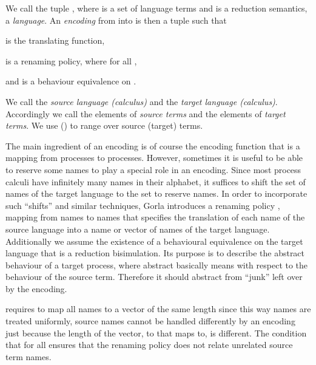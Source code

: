 \documentclass[final,copyright,creativecommons]{eptcs}
\begin{document}
We call the tuple , where  is a set of language terms and  is a reduction semantics, a \emph{language}.
An \emph{encoding} from  into  is then a tuple  such that
\begin{compactitem}
	\item  is the translating function,
	\item  is a renaming policy, where  for all ,
	\item and  is a behaviour equivalence on .
\end{compactitem}
We call  the \emph{source language (calculus)} and  the \emph{target language (calculus)}. Accordingly we call the elements of  \emph{source terms} and the elements of  \emph{target terms}.
We use  () to range over source (target) terms.

The main ingredient of an encoding is of course the encoding function  that is a mapping from processes to processes.
However, sometimes it is useful to be able to reserve some names to play a special role in an encoding.
Since most process calculi have infinitely many names in their alphabet, it suffices to shift the set of names  of the target language to the set  to reserve  names. In order to incorporate such ``shifts'' and similar techniques, Gorla introduces a renaming policy , \ie mapping from names to names that specifies the translation of each name of the source language into a name or vector of names of the target language.
Additionally we assume the existence of a behavioural equivalence  on the target language that is a reduction bisimulation. Its purpose is to describe the abstract behaviour of a target process, where abstract basically means with respect to the behaviour of the source term. Therefore it should abstract from ``junk'' left over by the encoding.

\cite{gorla} requires  to map all names to a vector of the same length since this way names are treated uniformly, \ie source names cannot be handled differently by an encoding just because the length of the vector, to that  maps to, is different.
The condition that  for all  ensures that the renaming policy does not relate unrelated source term names.
\end{document}
